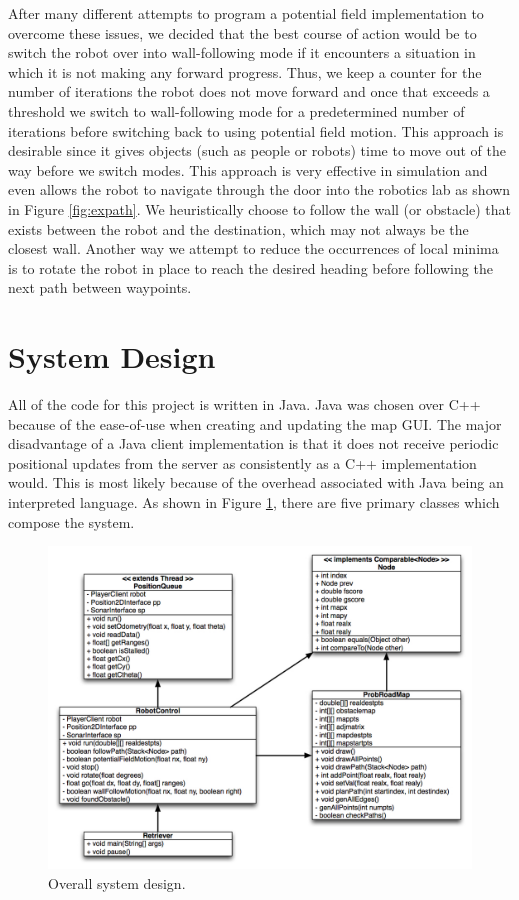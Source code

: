 \documentclass[11pt]{article}
\begin{document}
After many different attempts to program a potential field implementation to overcome these issues, we decided that the best course of action would be to switch the robot over into wall-following mode if it encounters a situation in which it is not making any forward progress. Thus, we keep a counter for the number of iterations the robot does not move forward and once that exceeds a threshold we switch to wall-following mode for a predetermined number of iterations before switching back to using potential field motion. This approach is desirable since it gives objects (such as people or robots) time to move out of the way before we switch modes. This approach is very effective in simulation and even allows the robot to navigate through the door into the robotics lab as shown in Figure \ref{fig:expath}. We heuristically choose to follow the wall (or obstacle) that exists between the robot and the destination, which may not always be the closest wall. Another way we attempt to reduce the occurrences of local minima is to rotate the robot in place to reach the desired heading before following the next path between waypoints.


\section{System Design}

All of the code for this project is written in Java. Java was chosen over C++ because of the ease-of-use when creating and updating the map GUI. The major disadvantage of a Java client implementation is that it does not receive periodic positional updates from the server as consistently as a C++ implementation would. This is most likely because of the overhead associated with Java being an interpreted language. As shown in Figure \ref{fig:uml}, there are five primary classes which compose the system.
 

\begin{figure}[H]
\centering
\includegraphics[scale=.6]{img/UML.jpg}
\caption{Overall system design.}
\label{fig:uml}
\end{figure}
\end{document}
